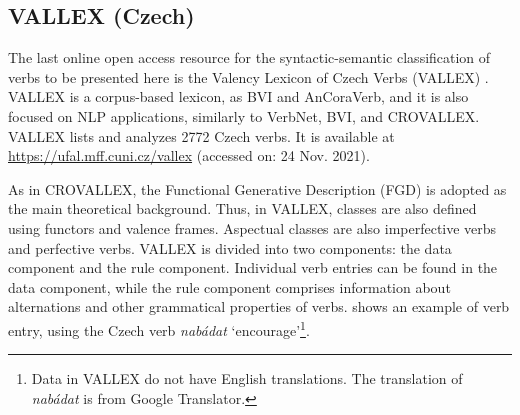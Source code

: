 \documentclass[english]{textolivre}
\begin{document}
\subsection{VALLEX (Czech)}

The last online open access resource for the syntactic-semantic classification of verbs to be presented here is the Valency Lexicon of Czech Verbs (VALLEX) \cite{kettnerova_syntax-semantics_2012}. VALLEX is a corpus-based lexicon, as BVI and AnCoraVerb, and it is also focused on NLP applications, similarly to VerbNet, BVI, and CROVALLEX. VALLEX lists and analyzes 2772 Czech verbs. It is available at \url{https://ufal.mff.cuni.cz/vallex} (accessed on: 24 Nov. 2021).

As in CROVALLEX, the Functional Generative Description (FGD) is adopted as the main theoretical background. Thus, in VALLEX, classes are also defined using functors and valence frames. Aspectual classes are also imperfective verbs and perfective verbs. VALLEX is divided into two components: the data component and the rule component. Individual verb entries can be found in the data component, while the rule component comprises information about alternations and other grammatical properties of verbs.  shows an example of verb entry, using the Czech verb \textit{nabádat} ‘encourage’\footnote{Data in VALLEX do not have English translations. The translation of \textit{nabádat} is from Google Translator.}. 
\end{document}
